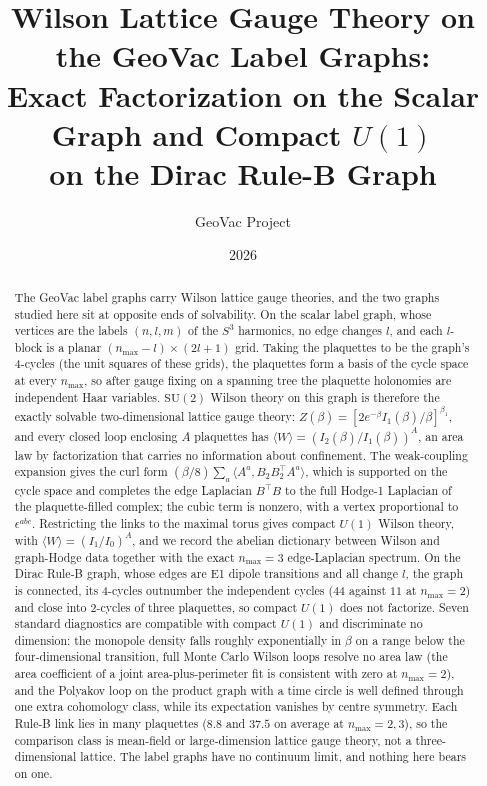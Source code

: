 \documentclass[11pt]{article}
\title{Wilson Lattice Gauge Theory on the GeoVac Label Graphs:\\
Exact Factorization on the Scalar Graph and Compact $U(1)$\\
on the Dirac Rule-B Graph}
\author{GeoVac Project}
\date{2026}
\begin{document}
\sloppy
\maketitle

\begin{abstract}
The GeoVac label graphs carry Wilson lattice gauge theories, and the two
graphs studied here sit at opposite ends of solvability.  On the scalar
label graph, whose vertices are the labels $(n,l,m)$ of the $S^3$
harmonics, no edge changes $l$, and each $l$-block is a planar
$(n_{\max}-l)\times(2l+1)$ grid.  Taking the plaquettes to be the graph's
4-cycles (the unit squares of these grids), the plaquettes form a basis of
the cycle space at every $n_{\max}$, so after gauge fixing on a spanning
tree the plaquette holonomies are independent Haar variables.
$\mathrm{SU}(2)$ Wilson theory on this graph is therefore the exactly
solvable two-dimensional lattice gauge theory:
$Z(\beta) = [2e^{-\beta} I_1(\beta)/\beta]^{\beta_1}$, and every closed
loop enclosing $A$ plaquettes has
$\langle W \rangle = (I_2(\beta)/I_1(\beta))^{A}$, an area law by
factorization that carries no information about confinement.  The
weak-coupling expansion gives the curl form
$(\beta/8)\sum_a \langle A^a, B_2 B_2^{\top} A^a\rangle$, which is
supported on the cycle space and completes the edge Laplacian
$B^{\top}B$ to the full Hodge-1 Laplacian of the plaquette-filled complex;
the cubic term is nonzero, with a vertex proportional to
$\epsilon^{abc}$.  Restricting the links to the maximal torus gives compact
$U(1)$ Wilson theory, with $\langle W\rangle = (I_1/I_0)^A$, and we record
the abelian dictionary between Wilson and graph-Hodge data together with
the exact $n_{\max}=3$ edge-Laplacian spectrum.  On the Dirac Rule-B
graph, whose edges are E1 dipole transitions and all change $l$, the graph
is connected, its 4-cycles outnumber the independent cycles ($44$ against
$11$ at $n_{\max}=2$) and close into 2-cycles of three plaquettes, so
compact $U(1)$ does not factorize.  Seven standard diagnostics are
compatible with compact $U(1)$ and discriminate no dimension: the
monopole density falls roughly exponentially in $\beta$ on a range below
the four-dimensional transition, full Monte Carlo Wilson loops resolve no
area law (the area coefficient of a joint area-plus-perimeter fit is
consistent with zero at $n_{\max}=2$), and the Polyakov loop on the
product graph with a time circle is well defined through one extra
cohomology class, while its expectation vanishes by centre symmetry.  Each
Rule-B link lies in many plaquettes ($8.8$ and $37.5$ on average at
$n_{\max}=2,3$), so the comparison class is mean-field or large-dimension
lattice gauge theory, not a three-dimensional lattice.  The label graphs
have no continuum limit, and nothing here bears on one.
\end{abstract}
\end{document}

